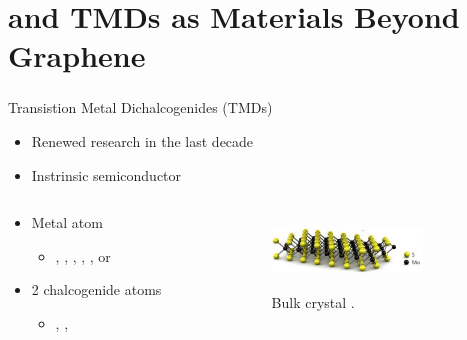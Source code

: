 \documentclass{beamer}
\begin{document}
\section{ and TMDs as Materials Beyond Graphene}
\begin{frame}
\frametitle{}
\begin{center}
Transistion Metal Dichalcogenides (TMDs)
\end{center}
\begin{itemize}
	\item Renewed research in the last decade
	\item Instrinsic semiconductor
\end{itemize}
\begin{columns}
	\begin{column}{0.48\textwidth}
		\begin{itemize}
			\item Metal atom 
				\begin{itemize}
					\item {}, , , , , or 
				\end{itemize}
			\item 2 chalcogenide atoms 
				\begin{itemize}
					\item {}, , 
				\end{itemize}
		\end{itemize}
	\end{column}
	\begin{column}{0.48\textwidth}
		\begin{figure}
			\includegraphics[height=2cm,width=4cm]{../present_figs/mos2monolayer}
			\caption{Bulk  crystal \cite{Wang2012}.}
		\end{figure}
	\end{column}
\end{columns}
\end{frame}
\end{document}

